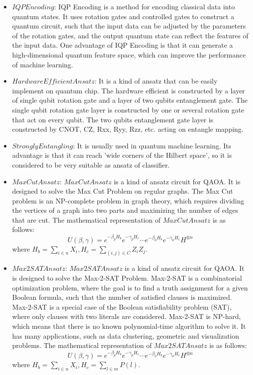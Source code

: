 \begin{itemize}
    \item $IQPEncoding$: IQP Encoding is a method for encoding classical data into quantum states\cite{Havlíček2019}. It uses rotation gates and controlled gates to construct a quantum circuit, such that the input data can be adjusted by the parameters of the rotation gates, and the output quantum state can reflect the features of the input data. One advantage of IQP Encoding is that it can generate a high-dimensional quantum feature space, which can improve the performance of machine learning.

    \item $HardwareEfficientAnsatz$: It is a kind of ansatz that can be easily implement on quantum chip\cite{Kandala2017}. The hardware efficient is constructed by a layer of single qubit rotation gate and a layer of two qubits entanglement gate. The single qubit rotation gate layer is constructed by one or several rotation gate that act on every qubit. The two qubits entanglement gate layer is constructed by CNOT, CZ, Rxx, Ryy, Rzz, etc. acting on entangle mapping.

    \item $StronglyEntangling$: It is usually used in quantum machine learning. Its advantage is that it can reach 'wide corners of the Hilbert space'\cite{Schuld_2020}, so it is considered to be very suitable as ansatz of classifier.

    \item $MaxCutAnsatz$: $MaxCutAnsatz$ is a kind of ansatz circuit for QAOA\cite{farhi2014quantum}. It is designed to solve the Max Cut Problem on regular graphs. The Max Cut problem is an NP-complete problem in graph theory, which requires dividing the vertices of a graph into two parts and maximizing the number of edges that are cut. The mathematical representation of $MaxCutAnsatz$ is as follows:
          $$U(\beta, \gamma) = e^{-\beta_pH_b}e^{-\gamma_pH_c}
              \cdots e^{-\beta_0H_b}e^{-\gamma_0H_c}H^{\otimes n}$$
          where $H_b = \sum_{i\in n}X_{i}, H_c = \sum_{(i,j)\in C}Z_iZ_j$.

    \item $Max2SATAnsatz$: $Max2SATAnsatz$ is a kind of ansatz circuit for QAOA\cite{Akshay_2020}. It is designed to solve the Max-2-SAT Problem. Max-2-SAT is a combinatorial optimization problem, where the goal is to find a truth assignment for a given Boolean formula, such that the number of satisfied clauses is maximized. Max-2-SAT is a special case of the Boolean satisfiability problem (SAT), where only clauses with two literals are considered. Max-2-SAT is NP-hard, which means that there is no known polynomial-time algorithm to solve it. It has many applications, such as data clustering, geometric and visualization problems. The mathematical representation of $Max2SATAnsatz$ is as follows:
          $$U(\beta, \gamma) = e^{-\beta_pH_b}e^{-\gamma_pH_c}
              \cdots e^{-\beta_0H_b}e^{-\gamma_0H_c}H^{\otimes n}$$
          where $H_b = \sum_{i\in n}X_{i}, H_c = \sum_{l\in m}P(l)$.


\end{itemize}
